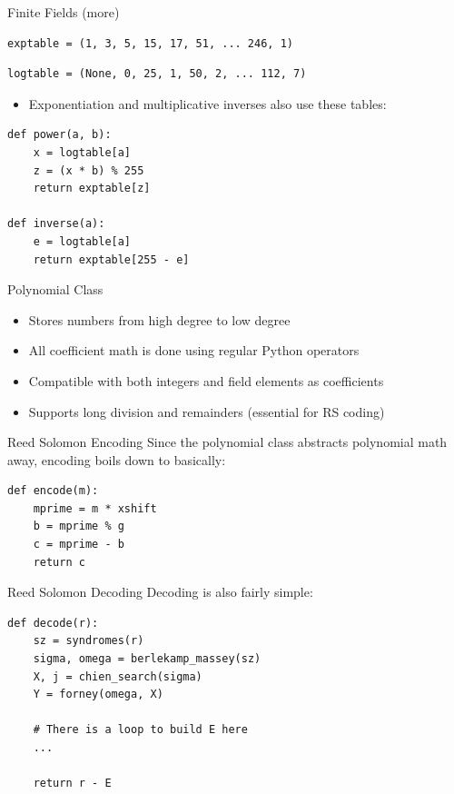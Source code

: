 \documentclass[]{prosper}
\begin{document}
\begin{slide}{Finite Fields (more)}
\begin{verbatim}exptable = (1, 3, 5, 15, 17, 51, ... 246, 1)\end{verbatim}
\begin{verbatim}logtable = (None, 0, 25, 1, 50, 2, ... 112, 7)\end{verbatim}
\begin{itemize}\item Exponentiation and multiplicative inverses also use these tables:\end{itemize}
\begin{verbatim}
def power(a, b):
    x = logtable[a]
    z = (x * b) % 255
    return exptable[z]

def inverse(a):
    e = logtable[a]
    return exptable[255 - e]
\end{verbatim}
\end{slide}

\begin{slide}{Polynomial Class}
\begin{itemize}
    \item Stores numbers from high degree to low degree
    \item All coefficient math is done using regular Python operators
    \item Compatible with both integers and field elements as coefficients
    \item Supports long division and remainders (essential for RS coding)
\end{itemize}
\end{slide}

\begin{slide}{Reed Solomon Encoding}
    Since the polynomial class abstracts polynomial math away, encoding boils down to basically:
\begin{verbatim}
def encode(m):
    mprime = m * xshift
    b = mprime % g
    c = mprime - b
    return c
\end{verbatim}
\end{slide}

\begin{slide}{Reed Solomon Decoding}
Decoding is also fairly simple:
\begin{verbatim}
def decode(r):
    sz = syndromes(r)
    sigma, omega = berlekamp_massey(sz)
    X, j = chien_search(sigma)
    Y = forney(omega, X)

    # There is a loop to build E here
    ...

    return r - E
\end{verbatim}
\end{slide}
\end{document}
